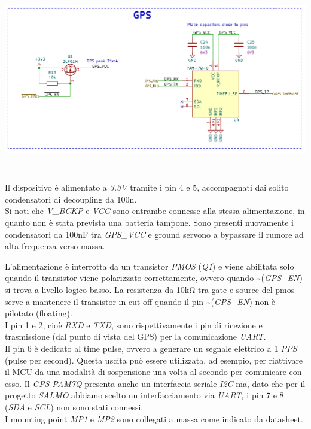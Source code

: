 \begin{center}
\includegraphics[width=6.5in,height=3.19444in]{figures/image26.png}
\captionsetup{type=figure}
\end{center}

Il dispositivo è alimentato a \emph{3.3V} tramite i pin 4 e 5,
accompagnati dai solito condensatori di decoupling da 100n.\\
Si noti che \emph{V\_BCKP} e \emph{VCC} sono entrambe connesse alla stessa
alimentazione, in quanto non è stata prevista una batteria tampone. Sono
presenti nuovamente i condensatori da 100nF tra \emph{GPS\_VCC} e ground
servono a bypassare il rumore ad alta frequenza verso massa.

L'alimentazione è interrotta da un transistor \emph{PMOS} (\emph{Q1}) e
viene abilitata solo quando il transistor viene polarizzato
correttamente, ovvero quando \textasciitilde(\emph{GPS\_EN}) si trova a
livello logico basso. La resistenza da 10kΩ tra gate e source del pmos
serve a mantenere il transistor in cut off quando il pin
\textasciitilde(\emph{GPS\_EN}) non è pilotato (floating).\\
I pin 1 e 2, cioè \emph{RXD} e \emph{TXD}, sono rispettivamente i pin di
ricezione e trasmissione (dal punto di vista del GPS) per la comunicazione \emph{UART}.\\
Il pin 6 è dedicato al time pulse, ovvero a generare un segnale
elettrico a 1 \emph{PPS} (pulse per second). Questa uscita può essere
utilizzata, ad esempio, per riattivare il MCU da una modalità di
sospensione una volta al secondo per comunicare con esso. Il \emph{GPS}
\emph{PAM7Q} presenta anche un interfaccia seriale \emph{I2C} ma, dato
che per il progetto \emph{SALMO} abbiamo scelto un interfacciamento via
\emph{UART,} i pin 7 e 8 (\emph{SDA} e \emph{SCL}) non sono stati connessi.\\
I mounting point \emph{MP1} e \emph{MP2} sono collegati a massa come
indicato da datasheet.

